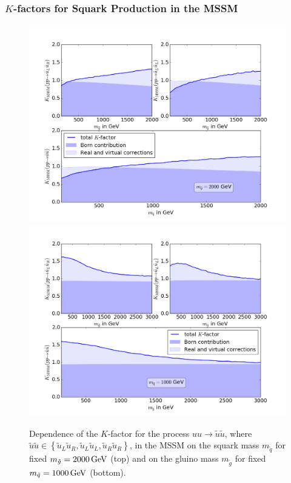 \subsubsection{$K$-factors for Squark Production in the MSSM}
\begin{figure}[!htpb]
\begin{center}
\includegraphics[scale=.5]{figures/MSSM_uu_susu_Kfactors_msg=2000GeV.png}
\includegraphics[scale=.5]{figures/MSSM_uu_susu_Kfactors_msq=1000GeV.png}
\caption{Dependence of the $K$-factor for the process $uu \to \tilde{u}\tilde{u}$, where $\tilde{u}\tilde{u} \in \left\{ \tilde{u}_L\tilde{u}_R, \tilde{u}_L\tilde{u}_L, \tilde{u}_R\tilde{u}_R \right\}$, in the MSSM on the squark mass $m_{\tilde{q}}$ for fixed $m_{\tilde{g}} = \unit[2000]{GeV}$ (top) and on the gluino mass $m_{\tilde{g}}$ for fixed $m_{\tilde{q}} = \unit[1000]{GeV}$ (bottom).}\label{fig:1LXsection_fixed_m}
\end{center}
\end{figure}
